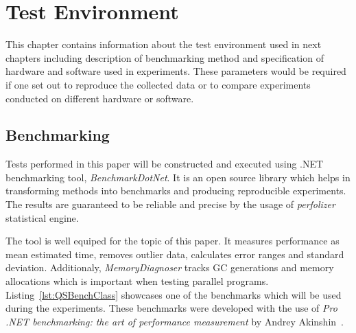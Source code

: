 \chapter{Test Environment} 
\label{chap:3}
This chapter contains information about the test environment used in next chapters including description of benchmarking method and specification of hardware and software used in experiments. These parameters would be required if one set out to reproduce the collected data or to compare experiments conducted on different hardware or software.

\section{Benchmarking}
Tests performed in this paper will be constructed and executed using .NET benchmarking tool, \emph{BenchmarkDotNet}. It is an open source library which helps in transforming methods into benchmarks and producing reproducible experiments. The results are guaranteed to be reliable and precise by the usage of \emph{perfolizer} statistical engine. 

The tool is well equiped for the topic of this paper. It measures performance as mean estimated time, removes outlier data, calculates error ranges and standard deviation. Additionaly, \emph{MemoryDiagnoser} tracks GC generations and memory allocations which is important when testing parallel programs. Listing~\ref{lst:QSBenchClass} showcases one of the benchmarks which will be used during the experiments.
These benchmarks were developed with the use of \emph{Pro .NET benchmarking: the art of performance measurement} by Andrey Akinshin~\cite{Akinshin2019}.

